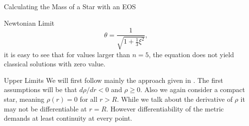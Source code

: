 \begin{section}{Calculating the Mass of a Star with an EOS}
\begin{subsection}{Newtonian Limit}
\begin{equation}
	\theta = \frac{1}{\sqrt{1+\frac{1}{3}\xi^2}},
\end{equation}
it is easy to see that for values larger than $n=5$, the equation does not yield classical solutions with zero value.
%
%
\end{subsection}
%
%
% 
%
%
\begin{subsection}{Upper Limits}
We will first follow mainly the approach given in \cite{waldGeneralRelativity1984}. The first assumptions will be that $d\rho/dr<0$ and $\rho\geq0$. Also we again consider a compact star, meaning $\rho(r)=0$ for all $r>R$. While we talk about the derivative of $\rho$ it may not be differentiable at $r=R$. However differentiability of the metric demands at least continuity at every point. 

\end{subsection}
\end{section}
